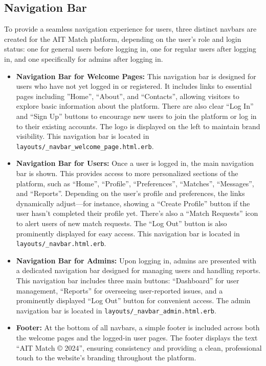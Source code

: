 \subsection{Navigation Bar}
To provide a seamless navigation experience for users, three distinct navbars are created for the AIT Match platform, depending on the user’s role and login status: one for general users before logging in, one for regular users after logging in, and one specifically for admins after logging in.

\begin{itemize}
    \item \textbf{Navigation Bar for Welcome Pages:} 
    This navigation bar is designed for users who have not yet logged in or registered. It includes links to essential pages including ”Home”, “About”, and “Contacts”, allowing visitors to explore basic information about the platform. There are also clear “Log In” and “Sign Up” buttons to encourage new users to join the platform or log in to their existing accounts. The logo is displayed on the left to maintain brand visibility. This navigation bar is located in \texttt{layouts/\_navbar\_welcome\_page.html.erb}.
    

    \item \textbf{Navigation Bar for Users:} 
    Once a user is logged in, the main navigation bar is shown. This provides access to more personalized sections of the platform, such as “Home”, “Profile”, “Preferences”, “Matches”, “Messages”, and “Reports”. Depending on the user's profile and preferences, the links dynamically adjust—for instance, showing a “Create Profile” button if the user hasn’t completed their profile yet. There’s also a “Match Requests” icon to alert users of new match requests. The “Log Out” button is also prominently displayed for easy access. This navigation bar is located in \texttt{layouts/\_navbar.html.erb}.

    \item \textbf{Navigation Bar for Admins:} 
    Upon logging in, admins are presented with a dedicated navigation bar designed for managing users and handling reports. This navigation bar includes three main buttons: “Dashboard” for user management, “Reports” for overseeing user-reported issues, and a prominently displayed “Log Out” button for convenient access. The admin navigation bar is located in \texttt{layouts/\_navbar\_admin.html.erb}.

    \item\textbf{Footer:} At the bottom of all navbars, a simple footer is included across both the welcome pages and the logged-in user pages. The footer displays the text “AIT Match © 2024”, ensuring consistency and providing a clean, professional touch to the website's branding throughout the platform.
\end{itemize}
\newpage
